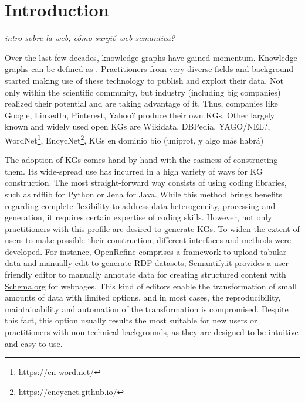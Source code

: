 \chapter{Introduction}
\label{chapter:intro}

\textit{intro sobre la web, cómo surgió web semantica?}



Over the last few decades, knowledge graphs have gained momentum. Knowledge graphs can be defined as . Practitioners from very diverse fields and background started making use of these technology to publish and exploit their data. Not only within the scientific community, but industry (including big companies) realized their potential and are taking advantage of it. Thus, companies like Google, LinkedIn, Pinterest, Yahoo? produce their own KGs. Other largely known and widely used open KGs are Wikidata, DBPedia, YAGO/NEL?, WordNet\footnote{\url{https://en-word.net/}}, EncycNet\footnote{\url{https://encycnet.github.io/}}, KGs en dominio bio (uniprot, y algo más habrá)


The adoption of KGs comes hand-by-hand with the easiness of constructing them. Its wide-spread use has incurred in a high variety of ways for KG construction. The most straight-forward way consists of using coding libraries, such as rdflib for Python or Jena for Java. While this method brings benefits regarding complete flexibility to address data heterogeneity, processing and generation, it requires certain expertise of coding skills. However, not only practitioners with this profile are desired to generate KGs. To widen the extent of users to make possible their construction, different interfaces and methods were developed. For instance, OpenRefine comprises a framework to upload tabular data and manually edit to generate RDF datasets; Semantify.it provides a user-friendly editor to manually annotate data for creating structured content with \url{Schema.org} for webpages. This kind of editors enable the transformation of small amounts of data with limited options, and in most cases, the reproducibility, maintainability and automation of the transformation is compromised. Despite this fact, this option usually results the most suitable for new users or practitioners with non-technical backgrounds, as they are designed to be intuitive and easy to use. 

